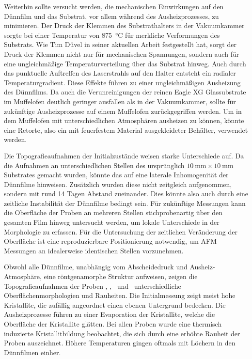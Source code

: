 Weiterhin sollte versucht werden, die mechanischen Einwirkungen auf den Dünnfilm und das Substrat, vor allem
während des Ausheizprozesses, zu minimieren.
Der Druck der Klemmen des Substrathalters in der Vakuumkammer sorgte bei einer Temperatur von \qty{875}{\degreeCelsius}
für merkliche Verformungen des Substrats.
Wie Tim Düvel in seiner aktuellen Arbeit festgestellt hat, sorgt der Druck der Klemmen nicht nur für
mechanischen Spannungen, sondern auch für eine ungleichmäßige Temperaturverteilung über das Substrat hinweg.
Auch durch das punktuelle Auftreffen des Laserstrahls auf den Halter entsteht ein radialer Temperaturgradient.
Diese Effekte führen zu einer ungleichmäßigen Ausheizung des Dünnfilms.
Da auch die Verunreinigungen der reinen Eagle XG Glassubstrate im Muffelofen deutlich geringer ausfallen als in der
Vakuumkammer, sollte für zukünftige Ausheizprozesse auf einem Muffelofen zurückgegriffen werden.
Um in dem Muffelofen mit unterschiedlichen Atmosphären ausheizen zu können, könnte eine Retorte, also ein mit
feuerfestem Material ausgekleideter Behälter, verwendet werden.

Die Topografieaufnahmen der Initialzustände weisen starke Unterschiede auf.
Da die Aufnahmen an unterschiedlichen Stellen des ursprünglich $\qty{10}{\milli\meter} \times \qty{10}{\milli\meter}$
Substrates gemacht wurden, könnte das auf eine laterale Inhomogenität der Dünnfilme hinweisen.
Zusätzlich wurden diese nicht zeitgleich aufgenommen, sondern mit rund 14 Tagen Abstand zueinander.
Dies könnte also auch durch eine zeitliche Instabilität der Dünnfilme bedingt sein.
Für zukünftige Messungen kann die Oberfläche der Proben an mehreren Stellen stichprobenartig über den gesamten Film
hinweg untersucht werden, um lokale Unterschiede in der Morphologie zu erfassen.
Für die Untersuchung der zeitlichen Veränderung der Oberfläche ist eine reproduzierbare Positionierung notwendig, um
AFM Messungen an idealerweise identischen Stellen vorzunehmen.

Obwohl alle Dünnfilme, unabhängig vom Abscheidedruck und Ausheiz-Atmosphäre, eine röntgenamorphe Struktur aufweisen,
zeigen die Topografieaufnahmen der Proben \samplethree, \sampleone, \sampletwo\ und \samplefour\ unterschiedliche
Oberflächenmorphologien und Rauheiten.
Die Initialmessung zeigt meist hohe Kristallite, die zufällig angeordnet einen ebenen Untergrund bedecken.
Die Ausheizprozesse führen zu einer Evaporation der Kristallite, welche die Oberfläche der Kristallite glätten.
Bei allen Proben wurde eine thermisch induzierte Kristallitbildung beobachtet, die sich durch eine erhöhte Rauheit
der Proben auszeichnet.
Höhere Temperaturen gingen oftmals mit Löchern in den Dünnfilmen einher.


